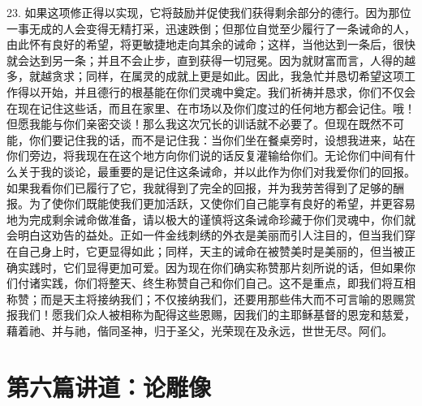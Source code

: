 23. 如果这项修正得以实现，它将鼓励并促使我们获得剩余部分的德行。因为那位一事无成的人会变得无精打采，迅速跌倒；但那位自觉至少履行了一条诫命的人，由此怀有良好的希望，将更敏捷地走向其余的诫命；这样，当他达到一条后，很快就会达到另一条；并且不会止步，直到获得一切冠冕。因为就财富而言，人得的越多，就越贪求；同样，在属灵的成就上更是如此。因此，我急忙并恳切希望这项工作得以开始，并且德行的根基能在你们灵魂中奠定。我们祈祷并恳求，你们不仅会在现在记住这些话，而且在家里、在市场以及你们度过的任何地方都会记住。哦！但愿我能与你们亲密交谈！那么我这次冗长的训话就不必要了。但现在既然不可能，你们要记住我的话，而不是记住我：当你们坐在餐桌旁时，设想我进来，站在你们旁边，将我现在在这个地方向你们说的话反复灌输给你们。无论你们中间有什么关于我的谈论，最重要的是记住这条诫命，并以此作为你们对我爱你们的回报。如果我看你们已履行了它，我就得到了完全的回报，并为我劳苦得到了足够的酬报。为了使你们既能使我们更加活跃，又使你们自己能享有良好的希望，并更容易地为完成剩余诫命做准备，请以极大的谨慎将这条诫命珍藏于你们灵魂中，你们就会明白这劝告的益处。正如一件金线刺绣的外衣是美丽而引人注目的，但当我们穿在自己身上时，它更显得如此；同样，天主的诫命在被赞美时是美丽的，但当被正确实践时，它们显得更加可爱。因为现在你们确实称赞那片刻所说的话，但如果你们付诸实践，你们将整天、终生称赞自己和你们自己。这不是重点，即我们将互相称赞；而是天主将接纳我们；不仅接纳我们，还要用那些伟大而不可言喻的恩赐赏报我们！愿我们众人被相称为配得这些恩赐，因我们的主耶稣基督的恩宠和慈爱，藉着祂、并与祂，偕同圣神，归于圣父，光荣现在及永远，世世无尽。阿们。\par



\section{第六篇讲道：论雕像}

\par

